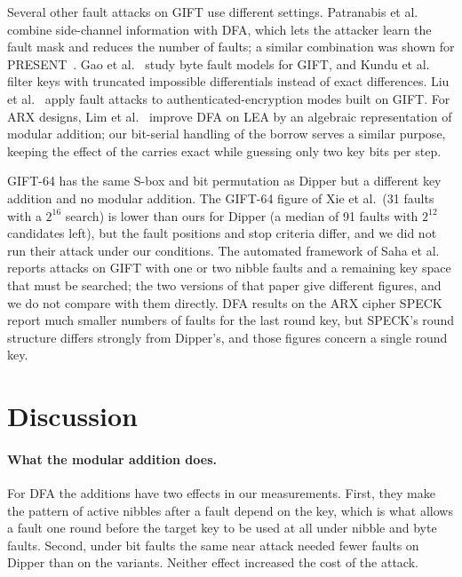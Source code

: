 \documentclass[pdflatex,sn-mathphys-num]{sn-jnl}
\theoremstyle{thmstyleone}%
\theoremstyle{thmstylethree}%
\begin{document}
Several other fault attacks on GIFT use different settings. Patranabis et al.~\cite{Patranabis2019}
combine side-channel information with DFA, which lets the attacker learn the fault mask and reduces the
number of faults; a similar combination was shown for PRESENT~\cite{Patranabis2017}. Gao et
al.~\cite{Gao2024} study byte fault models for GIFT, and Kundu et al.~\cite{Kundu2025} filter keys with
truncated impossible differentials instead of exact differences. Liu et al.~\cite{Liu2022} apply fault
attacks to authenticated-encryption modes built on GIFT. For ARX designs, Lim et al.~\cite{Lim2020} improve
DFA on LEA by an algebraic representation of modular addition; our bit-serial handling of the borrow serves
a similar purpose, keeping the effect of the carries exact while guessing only two key bits per step.

GIFT-64 has the same S-box and bit permutation as Dipper but a different key addition and no modular
addition. The GIFT-64 figure of Xie et al.\ (31 faults with a $2^{16}$ search) is lower than ours for Dipper
(a median of 91 faults with $2^{12}$ candidates left), but the fault positions and stop criteria differ, and
we did not run their attack under our conditions. The automated framework of Saha et al.~\cite{Saha2018}
reports attacks on GIFT with one or two nibble faults and a remaining key space that must be searched; the
two versions of that paper give different figures, and we do not compare with them directly. DFA results on the ARX cipher SPECK~\cite{Tupsamudre2014,Huo2015} report much smaller
numbers of faults for the last round key, but SPECK's round structure differs strongly from Dipper's, and those
figures concern a single round key.

\section{Discussion}\label{sec:discussion}

\paragraph{What the modular addition does.} For DFA the additions have two effects in our
measurements. First, they make the
pattern of active nibbles after a fault depend on the key, which is what allows a fault one round before
the target key to be used at all under nibble and byte faults. Second, under bit faults the same near attack
needed fewer faults on Dipper than on the variants. Neither effect increased the cost of the attack.
\end{document}
